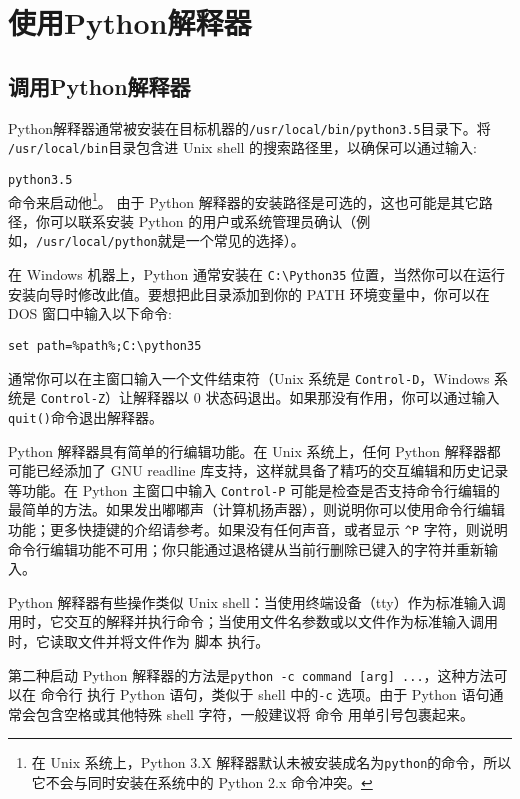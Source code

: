 \chapter{使用Python解释器\label{Interpreter}}
\section{调用Python解释器}
Python解释器通常被安装在目标机器的\texttt{/usr/local/bin/python3.5}目录下。将 \texttt{/usr/local/bin}目录包含进 Unix shell 的搜索路径里，以确保可以通过输入:

\verb|python3.5|\\
命令来启动他\footnote{在 Unix 系统上，Python 3.X 解释器默认未被安装成名为\texttt{python}的命令，所以它不会与同时安装在系统中的 Python 2.x 命令冲突。}。 由于 Python 解释器的安装路径是可选的，这也可能是其它路径，你可以联系安装 Python 的用户或系统管理员确认（例如，\texttt{/usr/local/python}就是一个常见的选择）。

在 Windows 机器上，Python 通常安装在 \texttt{C:\textbackslash{}Python35} 位置，当然你可以在运行安装向导时修改此值。要想把此目录添加到你的 PATH 环境变量中，你可以在 DOS 窗口中输入以下命令:

\texttt{set path=\%path\%;C:\textbackslash{}python35}

通常你可以在主窗口输入一个文件结束符（Unix 系统是 \texttt{Control-D}，Windows 系统是 \texttt{Control-Z}）让解释器以 0 状态码退出。如果那没有作用，你可以通过输入\texttt{quit()}命令退出解释器。

Python 解释器具有简单的行编辑功能。在 Unix 系统上，任何 Python 解释器都可能已经添加了 GNU readline 库支持，这样就具备了精巧的交互编辑和历史记录等功能。在 Python 主窗口中输入 \texttt{Control-P} 可能是检查是否支持命令行编辑的最简单的方法。如果发出嘟嘟声（计算机扬声器），则说明你可以使用命令行编辑功能；更多快捷键的介绍请参考。如果没有任何声音，或者显示 \texttt{\^{}P} 字符，则说明命令行编辑功能不可用；你只能通过退格键从当前行删除已键入的字符并重新输入。

Python 解释器有些操作类似 Unix shell：当使用终端设备（tty）作为标准输入调用时，它交互的解释并执行命令；当使用文件名参数或以文件作为标准输入调用时，它读取文件并将文件作为 脚本 执行。

第二种启动 Python 解释器的方法是\texttt{python -c command [arg] ...}，这种方法可以在 命令行 执行 Python 语句，类似于 shell 中的\texttt{-c} 选项。由于 Python 语句通常会包含空格或其他特殊 shell 字符，一般建议将 命令 用单引号包裹起来。

